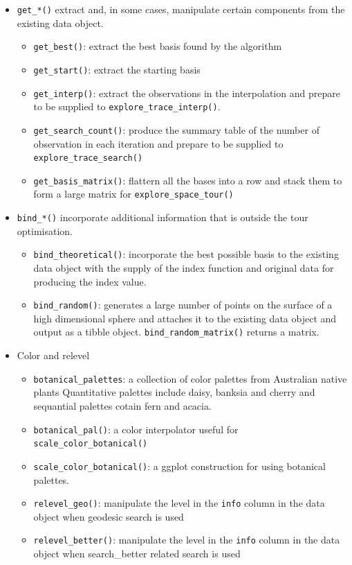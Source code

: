 \documentclass[12pt]{article}
\providecommand{\tightlist}{%
  \setlength{\itemsep}{0pt}\setlength{\parskip}{0pt}}
\begin{document}
\begin{itemize}
\item
  \texttt{get\_*()} extract and, in some cases, manipulate certain components from the existing data object.

  \begin{itemize}
  \tightlist
  \item
    \texttt{get\_best()}: extract the best basis found by the algorithm
  \item
    \texttt{get\_start()}: extract the starting basis
  \item
    \texttt{get\_interp()}: extract the observations in the interpolation and prepare to be supplied to \texttt{explore\_trace\_interp()}.
  \item
    \texttt{get\_search\_count()}: produce the summary table of the number of observation in each iteration and prepare to be supplied to \texttt{explore\_trace\_search()}
  \item
    \texttt{get\_basis\_matrix()}: flattern all the bases into a row and stack them to form a large matrix for \texttt{explore\_space\_tour()}
  \end{itemize}
\item
  \texttt{bind\_*()} incorporate additional information that is outside the tour optimisation.

  \begin{itemize}
  \tightlist
  \item
    \texttt{bind\_theoretical()}: incorporate the best possible basis to the existing data object with the supply of the index function and original data for producing the index value.
  \item
    \texttt{bind\_random()}: generates a large number of points on the surface of a high dimensional sphere and attaches it to the existing data object and output as a tibble object. \texttt{bind\_random\_matrix()} returns a matrix.
  \end{itemize}
\item
  Color and relevel

  \begin{itemize}
  \tightlist
  \item
    \texttt{botanical\_palettes}: a collection of color palettes from Australian native plants Quantitative palettes include daisy, banksia and cherry and sequantial palettes cotain fern and acacia.
  \item
    \texttt{botanical\_pal()}: a color interpolator useful for \texttt{scale\_color\_botanical()}
  \item
    \texttt{scale\_color\_botanical()}: a ggplot construction for using botanical palettes.
  \item
    \texttt{relevel\_geo()}: manipulate the level in the \texttt{info} column in the data object when geodesic search is used
  \item
    \texttt{relevel\_better()}: manipulate the level in the \texttt{info} column in the data object when search\_better related search is used
  \end{itemize}
\end{itemize}
\end{document}

